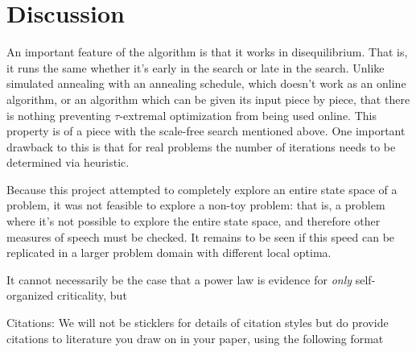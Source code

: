 \documentclass[12pt]{article}
\begin{document}

\section{Discussion}

An important feature of the algorithm is that it works in disequilibrium. That is, it runs the same whether it's early in the search or late in the search. Unlike simulated annealing with an annealing schedule, which doesn't work as an online algorithm, or an algorithm which can be given its input piece by piece, that there is nothing preventing $\tau$-extremal optimization from being used online. This property is of a piece with the scale-free search mentioned above. One important drawback to this is that for real problems the number of iterations needs to be determined via heuristic.

Because this project attempted to completely explore an entire state space of a problem, it was not feasible to explore a non-toy problem: that is, a problem where it's not possible to explore the entire state space, and therefore other measures of speech must be checked. It remains to be seen if this speed can be replicated in a larger problem domain with different local optima.


It cannot necessarily be the case that a power law is evidence for \emph{only} self-organized criticality, but %

\begin{thebibliography}[99]

    Citations:   We will not be sticklers for details of citation styles but do provide citations to literature you draw on in your paper, using the following format
\end{thebibliography}
\end{document}
